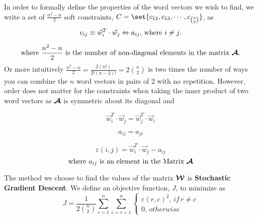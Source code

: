 \documentclass{article}
\begin{document}

In order to formally define the properties of the word vectors we wish to find, we write a set of $\frac{n^2 - n}{2}$ soft constraints, $C = \set{c_{12},c_{13},\cdots ,c_{n \choose 2}}$, as
\begin{equation*}
c_{ij} \equiv \vec{w}_{i}^T \cdot \vec{w}_{j} \logeq a_{ij} \text{, where $i \neq j$.}
\end{equation*}

\begin{equation*}
\text{where } \frac{n^2 - n}{2} \text{ is the number of non-diagonal elements in the matrix } \boldsymbol{\mathcal{A}}.
\end{equation*}
Or more intuitively $\frac{n^2 - n}{2} = \frac{2(n!)}{2!(n-2)!} = 2 {n \choose 2 }$ is two times the number of ways you can combine the $n$ word vectors in pairs of $2$ with no repetition. However, order does not matter for the constraints when taking the inner product of two word vectors as $\boldsymbol{\mathcal{A}}$ is symmetric about its diagonal and 

\begin{equation*}
\vec{w}_{i}^T \cdot \vec{w}_{j} = \vec{w}_{j}^T \cdot \vec{w}_{i}
\end{equation*}

\begin{equation*}
a_{ij} = a_{ji}
\end{equation*}


\begin{equation*}
\varepsilon(i,j) = \vec{w}_{i}^T \cdot \vec{w}_{j} - a_{ij}
\end{equation*}
\begin{equation*}
\text{where $a_{ij}$ is an element in the Matrix $\boldsymbol{\mathcal{A}}$}
\end{equation*}

The method we choose to find the values of the matrix $\boldsymbol{\mathcal{W}}$ is \textbf{Stochastic Gradient Descent}. We define an objective function, $J$, to minimize as
\begin{equation*}
J = \frac{1}{2 {n \choose 2} } \sum_{r=1}^{n}{\sum_{c=r+1}^{n}{
\begin{cases}
\varepsilon(r,c)^2, \, if \, r \neq c
\\
0, \, otherwise
\end{cases}
}}
\end{equation*}
\end{document}
